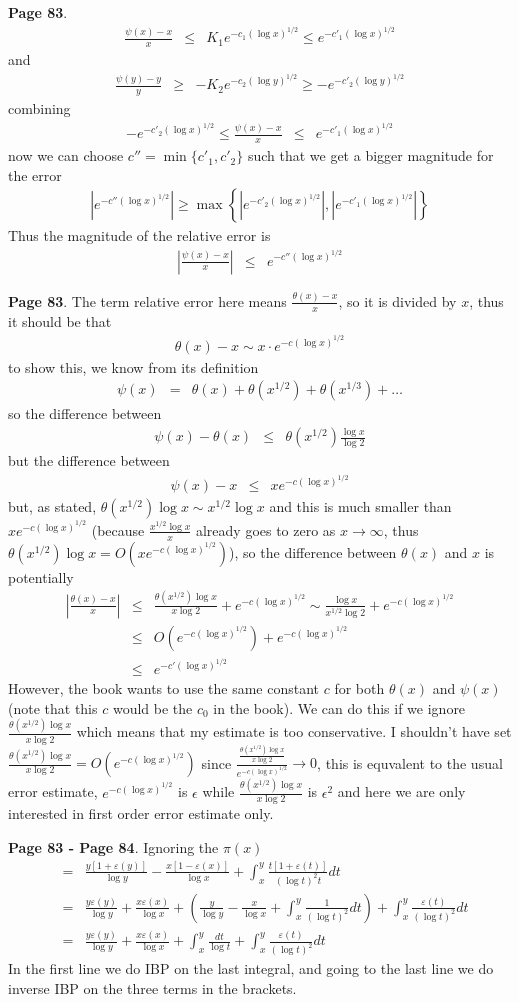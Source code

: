 \documentclass[aps,preprint,preprintnumbers,nofootinbib,showpacs,prd]{revtex4-1}
\newcommand{\nbea}{\begin{eqnarray*}}
\newcommand{\neea}{\end{eqnarray*}}
\begin{document}
{\bf Page 83}.
%
\nbea
\frac{\psi(x) - x}{x} & \le & K_1 e^{-c_1 (\log x)^{1/2}} \le e^{-c'_1 (\log x)^{1/2}}
\neea
%
and
%
\nbea
\frac{\psi(y) - y}{y} & \ge & -K_2 e^{-c_2 (\log y)^{1/2}} \ge - e^{-c'_2 (\log y)^{1/2}}
\neea
%
combining
%
\nbea
-e^{-c'_2 (\log x)^{1/2}} \le \frac{\psi(x) - x}{x} & \le & e^{-c'_1 (\log x)^{1/2}}
\neea
%
now we can choose  $c'' = \min\{c'_1,c'_2\}$ such that we get a bigger magnitude for the error
%
\nbea
|e^{-c'' (\log x)^{1/2}}| \ge \max \left \{ |e^{-c'_2 (\log x)^{1/2}}|, |e^{-c'_1 (\log x)^{1/2}}|\right \}
\neea
%
Thus the magnitude of the relative error is 
%
\nbea
\left | \frac{\psi(x) - x}{x} \right | & \le & e^{-c'' (\log x)^{1/2}}
\neea
%

{\bf Page 83}. The term relative error here means $\frac{\theta(x) - x}{x}$, so it is divided by $x$, thus it should be that 
%
\nbea
\theta(x) - x \sim x \cdot e^{-c (\log x)^{1/2}}
\neea
%
to show this, we know from its definition
%
\nbea
\psi(x) & = & \theta(x) + \theta(x^{1/2}) + \theta(x^{1/3}) + \dots
\neea
%
so the difference between
%
\nbea
\psi(x) - \theta(x)  & \le & \theta(x^{1/2}) \frac{\log x}{\log 2}
\neea
%
but the difference between
%
\nbea
\psi(x) - x & \le & x e^{-c(\log x)^{1/2}}
\neea
%
but, as stated, $\theta(x^{1/2}) \log x \sim x^{1/2} \log x$ and this is much smaller than $x e^{-c(\log x)^{1/2}}$ (because $\frac{x^{1/2} \log x}{x}$ already goes to zero as $x\to\infty$, thus $\theta(x^{1/2}) \log x = O(x e^{-c(\log x)^{1/2}})$), so the difference between $\theta(x)$ and $x$ is potentially
%
\nbea
\left | \frac{\theta(x) - x}{x}\right | & \le & \frac{\theta(x^{1/2})\log x}{x\log 2} + e^{-c(\log x)^{1/2}} \sim \frac{\log x}{x^{1/2}\log 2} + e^{-c(\log x)^{1/2}} \\
& \le & O(e^{-c(\log x)^{1/2}}) + e^{-c(\log x)^{1/2}} \\
& \le & e^{-c'(\log x)^{1/2}}
\neea
%
However, the book wants to use the same constant $c$ for both $\theta(x)$ and $\psi(x)$ (note that this $c$ would be the $c_0$ in the book). We can do this if we ignore $\frac{\theta(x^{1/2})\log x}{x\log 2}$ which means that my estimate is too conservative. I shouldn't have set $\frac{\theta(x^{1/2})\log x}{x\log 2} = O(e^{-c(\log x)^{1/2}})$ since $\frac{\frac{\theta(x^{1/2})\log x}{x\log 2}}{e^{-c(\log x)^{1/2}}} \to 0$, this is equvalent to the usual error estimate, $e^{-c(\log x)^{1/2}}$ is $\epsilon$ while $\frac{\theta(x^{1/2})\log x}{x\log 2}$ is $\epsilon^2$ and here we are only interested in first order error estimate only.

{\bf Page 83 - Page 84}. Ignoring the $\pi(x)$
%
\nbea
& = & \frac{y[1 + \varepsilon(y)]}{\log y} -\frac{x[1-\varepsilon(x)]}{\log x} + \int_x^y \frac{t[1+\varepsilon(t)]}{(\log t)^2 t} dt \\
& = & \frac{y\varepsilon(y)}{\log y} + \frac{x\varepsilon(x)}{\log x}  + \left(\frac{y}{\log y} -\frac{x}{\log x} + \int_x^y \frac{1}{(\log t)^2} dt \right) + \int_x^y \frac{\varepsilon(t)}{(\log t)^2} dt \\
& = & \frac{y\varepsilon(y)}{\log y} + \frac{x\varepsilon(x)}{\log x} + \int_x^y \frac{dt}{\log t} + \int_x^y \frac{\varepsilon(t)}{(\log t)^2} dt 
\neea
%
In the first line we do IBP on the last integral, and going to the last line we do inverse IBP on the three terms in the brackets.
\end{document}
